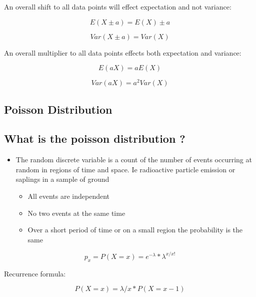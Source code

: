 \documentclass[11pt]{scrartcl} %
\begin{document}
An overall shift to all data points will effect expectation and not
variance:

\begin{equation}
	E(X \pm a) = E(X) \pm a
\end{equation}

\begin{equation}
	Var(X \pm a) = Var(X)
\end{equation}

An overall multiplier to all data points effects both expectation and
variance:

\begin{equation}
	E(aX) = aE(X)
\end{equation}

\begin{equation}
	Var(aX) = a^2Var(X)
\end{equation}

\subsection{Poisson Distribution}

\subsection{What is the poisson distribution
?}

\begin{itemize}
\item The random discrete variable is a count of the number of events occurring
  at random in regions of time and space. Ie radioactive particle emission or saplings in a sample of
  ground

  \begin{itemize}
  \item All events are independent
  \item No two events at the same time
  \item Over a short period of time or on a small region the probability is
    the same
  \end{itemize}
\end{itemize}

\begin{equation}
	p_x = P(X=x) = e^{-\lambda} *\lambda^{x/x!}
\end{equation}

Recurrence formula:

\begin{equation}
	P(X=x) = \lambda/x * P(X= x-1)
\end{equation}
\end{document}
